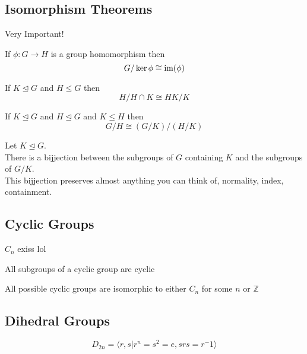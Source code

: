 \documentclass[11pt]{scrartcl}
\begin{document}
\subsection{Isomorphism Theorems}
Very Important!
\begin{theorem}
If  $\phi: G \to H$ is a group homomorphism then 
$$G/\ker{\phi} \cong \operatorname{im}(\phi)$$
\end{theorem}
\begin{theorem}
If $K \mathrel{\unlhd} G$ and $H \leq G$ then 
$$H/H\cap K \cong HK/K$$
\end{theorem}
\begin{theorem}
If $K \mathrel{\unlhd} G$ and $H \mathrel{\unlhd} G$ and $K \leq H$ then 
$$G/H \cong (G/K)/(H/K)$$
\end{theorem}
\begin{theorem}
Let $K \mathrel{\unlhd} G$.\\
There is a bijjection between the subgroups of $G$ containing $K$ and the subgroups of $G/K$. 
\\This bijjection preserves almost anything you can think of, normality, index, containment.
\end{theorem}
\subsection{Cyclic Groups}
\begin{definitions}
$C_{n}$ exiss lol 
\end{definitions}
\begin{prop}
All subgroups of a cyclic group are cyclic
\end{prop}
\begin{prop}
All possible cyclic groups are isomorphic to either $C_{n}$ for some $n$ or $\mathbb{Z}$
\end{prop}
\subsection{Dihedral Groups}
\begin{definitions}
$$D_{2n} = \langle r,s \vert r^n=s^2=e, srs=r^-1\rangle$$
\end{definitions}
\end{document}
